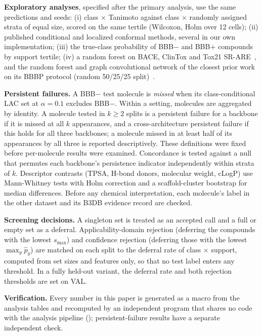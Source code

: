 \documentclass[10pt]{article}
\begin{document}
\textbf{Exploratory analyses}, specified after the primary analysis, use the same predictions and seeds: (i) class $\times$ Tanimoto against class $\times$ randomly assigned strata of equal size, scored on the same tertile (Wilcoxon, Holm over 12 cells); (ii) published conditional and localized conformal methods, several in our own implementation; (iii) the true-class probability of BBB$-$ and BBB$+$ compounds by support tertile; (iv) a random forest on BACE, ClinTox and Tox21 SR-ARE~\cite{wu2018moleculenet}, and the random forest and graph convolutional network of the closest prior work on its BBBP protocol (random 50/25/25 split)~\cite{tursunbadalov2026quiet}.

\textbf{Persistent failures.} A BBB$-$ test molecule is \emph{missed} when its class-conditional LAC set at $\alpha=0.1$ excludes BBB$-$. Within a setting, molecules are aggregated by identity. A molecule tested in $k\ge2$ splits is a persistent failure for a backbone if it is missed at all $k$ appearances, and a cross-architecture persistent failure if this holds for all three backbones; a molecule missed in at least half of its appearances by all three is reported descriptively. These definitions were fixed before per-molecule results were examined. Concordance is tested against a null that permutes each backbone's persistence indicator independently within strata of $k$. Descriptor contrasts (TPSA, H-bond donors, molecular weight, cLogP) use Mann-Whitney tests with Holm correction and a scaffold-cluster bootstrap for median differences. Before any chemical interpretation, each molecule's label in the other dataset and its B3DB evidence record are checked.

\textbf{Screening decisions.} A singleton set is treated as an accepted call and a full or empty set as a deferral. Applicability-domain rejection (deferring the compounds with the lowest $s_{\max}$) and confidence rejection (deferring those with the lowest $\max_y\hat p_y$) are matched on each split to the deferral rate of class $\times$ support, computed from set sizes and features only, so that no test label enters any threshold. In a fully held-out variant, the deferral rate and both rejection thresholds are set on VAL.

\textbf{Verification.} Every number in this paper is generated as a macro from the analysis tables and recomputed by an independent program that shares no code with the analysis pipeline (); persistent-failure results have a separate independent check.
\end{document}
